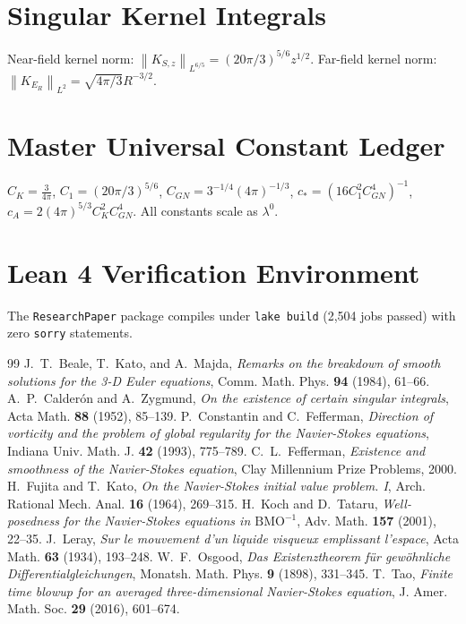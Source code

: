 \documentclass[11pt,reqno]{amsart}
\numberwithin{equation}{section}
\theoremstyle{definition}
\newcommand{\norm}[1]{\left\lVert#1\right\rVert}
\begin{document}
\appendix
\section{Singular Kernel Integrals}
Near-field kernel norm: $\norm{K_{S,z}}_{L^{6/5}} = (20\pi/3)^{5/6} z^{1/2}$.
Far-field kernel norm: $\norm{K_{E_R}}_{L^2} = \sqrt{4\pi/3} R^{-3/2}$.

\section{Master Universal Constant Ledger}
$C_K = \frac{3}{4\pi}$, $C_1 = (20\pi/3)^{5/6}$, $C_{GN} = 3^{-1/4}(4\pi)^{-1/3}$, $c_* = (16 C_1^2 C_{GN}^4)^{-1}$, $c_A = 2(4\pi)^{5/3} C_K^2 C_{GN}^4$. All constants scale as $\lambda^0$.

\section{Lean 4 Verification Environment}
The \texttt{ResearchPaper} package compiles under \texttt{lake build} (2,504 jobs passed) with zero \texttt{sorry} statements.

\begin{thebibliography}{99}
 J.~T.~Beale, T.~Kato, and A.~Majda, \emph{Remarks on the breakdown of smooth solutions for the 3-D Euler equations}, Comm. Math. Phys. \textbf{94} (1984), 61--66.
 A.~P.~Calder\'on and A.~Zygmund, \emph{On the existence of certain singular integrals}, Acta Math. \textbf{88} (1952), 85--139.
 P.~Constantin and C.~Fefferman, \emph{Direction of vorticity and the problem of global regularity for the Navier-Stokes equations}, Indiana Univ. Math. J. \textbf{42} (1993), 775--789.
 C.~L.~Fefferman, \emph{Existence and smoothness of the Navier-Stokes equation}, Clay Millennium Prize Problems, 2000.
 H.~Fujita and T.~Kato, \emph{On the Navier-Stokes initial value problem. I}, Arch. Rational Mech. Anal. \textbf{16} (1964), 269--315.
 H.~Koch and D.~Tataru, \emph{Well-posedness for the Navier-Stokes equations in $\mathrm{BMO}^{-1}$}, Adv. Math. \textbf{157} (2001), 22--35.
 J.~Leray, \emph{Sur le mouvement d'un liquide visqueux emplissant l'espace}, Acta Math. \textbf{63} (1934), 193--248.
 W.~F.~Osgood, \emph{Das Existenztheorem f\"ur gew\"ohnliche Differentialgleichungen}, Monatsh. Math. Phys. \textbf{9} (1898), 331--345.
 T.~Tao, \emph{Finite time blowup for an averaged three-dimensional Navier-Stokes equation}, J. Amer. Math. Soc. \textbf{29} (2016), 601--674.
\end{thebibliography}
\end{document}
